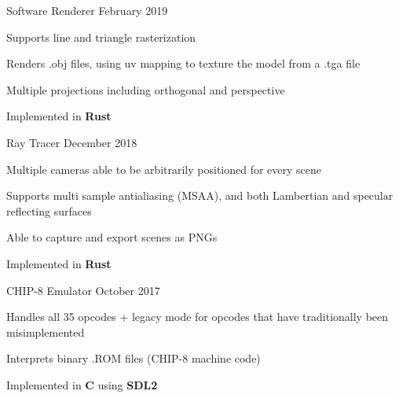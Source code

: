 

\begin{cventries}
    \cventry
    {Software Renderer} %
    {} %
    {}{February 2019}{
        \begin{cvitems} %
            \item {Supports line and triangle rasterization}
            \item {Renders .obj files, using uv mapping to texture the model from a .tga file}
            \item {Multiple projections including orthogonal and perspective}
            \item {Implemented in \textbf{Rust}}
        \end{cvitems}
    }

    \cventry
    {Ray Tracer} %
    {} %
    {}{December 2018}{
        \begin{cvitems} %
            \item {Multiple cameras able to be arbitrarily positioned for every scene}
            \item {Supports multi sample antialiasing (MSAA), and both Lambertian and specular reflecting surfaces}
            \item {Able to capture and export scenes as PNGs}
            \item {Implemented in \textbf{Rust}}
        \end{cvitems}
    }

    \cventry
    {CHIP-8 Emulator} %
    {} %
    {}{October 2017}{
        \begin{cvitems} %
            \item {Handles all 35 opcodes + legacy mode for opcodes that have traditionally been misimplemented}
            \item {Interprets binary .ROM files (CHIP-8 machine code)}
            \item {Implemented in \textbf{C} using \textbf{SDL2}}
        \end{cvitems}
    }


\end{cventries}
